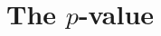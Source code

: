 \documentclass[]{report}\usepackage[]{graphicx}\usepackage[]{color}
\begin{document}
%
%
%
%
%
%
%
%
%
%
%
%
%

\section{The $p$-value}
\end{document}
